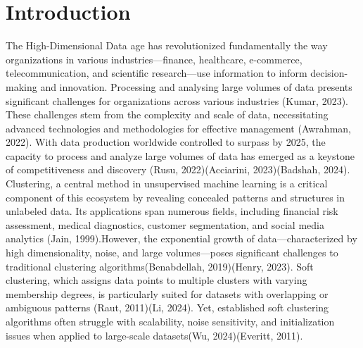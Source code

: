 \documentclass[twoside,11pt]{article}
\begin{document}
\section{Introduction}
The High-Dimensional Data age has revolutionized fundamentally the way organizations in various industries—finance, healthcare, e-commerce, telecommunication, and scientific research—use information to inform decision-making and innovation. Processing and analysing large volumes of data presents significant challenges for organizations across various industries \cite{Kumar2023} (Kumar, 2023). These challenges stem from the complexity and scale of data, necessitating advanced technologies and methodologies for effective management (Awrahman, 2022). With data production worldwide controlled to surpass by 2025, the capacity to process and analyze large volumes of data has emerged as a keystone of competitiveness and discovery (Rusu, 2022)(Acciarini, 2023)(Badshah, 2024). Clustering, a central method in unsupervised machine learning is a critical component of this ecosystem by revealing concealed patterns and structures in unlabeled data. Its applications span numerous fields, including financial risk assessment, medical diagnostics, customer segmentation, and social media analytics (Jain, 1999).However, the exponential growth of data—characterized by high dimensionality, noise, and large volumes—poses significant challenges to traditional clustering algorithms(Benabdellah, 2019)(Henry, 2023). Soft clustering, which assigns data points to multiple clusters with varying membership degrees, is particularly suited for datasets with overlapping or ambiguous patterns (Raut, 2011)(Li, 2024). Yet, established soft clustering algorithms often struggle with scalability, noise sensitivity, and initialization issues when applied to large-scale datasets(Wu, 2024)(Everitt, 2011).
\end{document}
